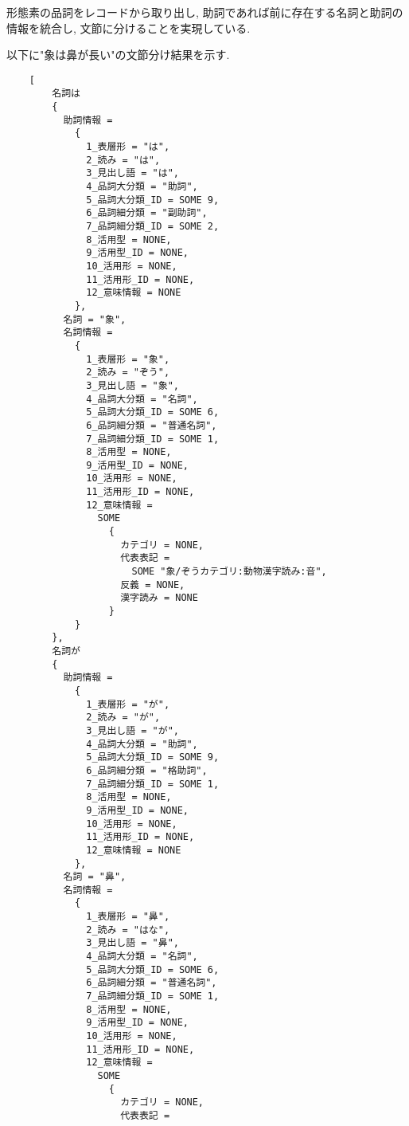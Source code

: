 \documentclass{jreport}
\begin{document}
形態素の品詞をレコードから取り出し, 助詞であれば前に存在する名詞と助詞の情報を統合し, 文節に分けることを実現している.

以下に"象は鼻が長い"の文節分け結果を示す.

\begin{Verbatim}
    [
        名詞は
        {
          助詞情報 =
            {
              1_表層形 = "は",
              2_読み = "は",
              3_見出し語 = "は",
              4_品詞大分類 = "助詞",
              5_品詞大分類_ID = SOME 9,
              6_品詞細分類 = "副助詞",
              7_品詞細分類_ID = SOME 2,
              8_活用型 = NONE,
              9_活用型_ID = NONE,
              10_活用形 = NONE,
              11_活用形_ID = NONE,
              12_意味情報 = NONE
            },
          名詞 = "象",
          名詞情報 =
            {
              1_表層形 = "象",
              2_読み = "ぞう",
              3_見出し語 = "象",
              4_品詞大分類 = "名詞",
              5_品詞大分類_ID = SOME 6,
              6_品詞細分類 = "普通名詞",
              7_品詞細分類_ID = SOME 1,
              8_活用型 = NONE,
              9_活用型_ID = NONE,
              10_活用形 = NONE,
              11_活用形_ID = NONE,
              12_意味情報 =
                SOME
                  {
                    カテゴリ = NONE,
                    代表表記 =
                      SOME "象/ぞうカテゴリ:動物漢字読み:音",
                    反義 = NONE,
                    漢字読み = NONE
                  }
            }
        },
        名詞が
        {
          助詞情報 =
            {
              1_表層形 = "が",
              2_読み = "が",
              3_見出し語 = "が",
              4_品詞大分類 = "助詞",
              5_品詞大分類_ID = SOME 9,
              6_品詞細分類 = "格助詞",
              7_品詞細分類_ID = SOME 1,
              8_活用型 = NONE,
              9_活用型_ID = NONE,
              10_活用形 = NONE,
              11_活用形_ID = NONE,
              12_意味情報 = NONE
            },
          名詞 = "鼻",
          名詞情報 =
            {
              1_表層形 = "鼻",
              2_読み = "はな",
              3_見出し語 = "鼻",
              4_品詞大分類 = "名詞",
              5_品詞大分類_ID = SOME 6,
              6_品詞細分類 = "普通名詞",
              7_品詞細分類_ID = SOME 1,
              8_活用型 = NONE,
              9_活用型_ID = NONE,
              10_活用形 = NONE,
              11_活用形_ID = NONE,
              12_意味情報 =
                SOME
                  {
                    カテゴリ = NONE,
                    代表表記 =

\end{Verbatim}
\end{document}
